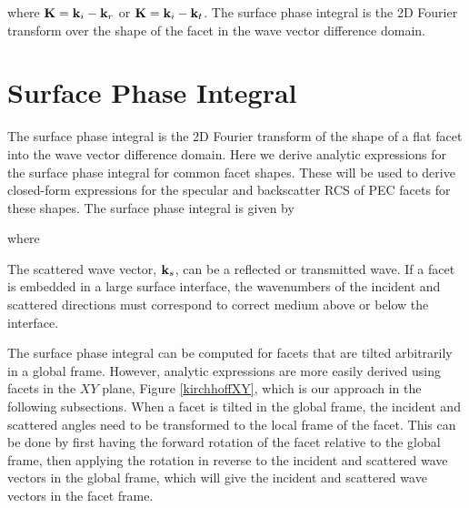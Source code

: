\noindent where $\mathbf{K} = \mathbf{k}_i - \mathbf{k}_r$ or $\mathbf{K} = \mathbf{k}_i - \mathbf{k}_t$.  The surface phase integral is the 2D Fourier transform over the shape of the facet in the wave vector difference domain. 


\section{Surface Phase Integral}
\label{secsurfphaseint}
The surface phase integral is the 2D Fourier transform of the shape of a flat facet into the wave vector difference domain. Here we derive analytic expressions for the surface phase integral for common facet shapes. These will be used to derive closed-form expressions for the specular and backscatter RCS of PEC facets for these shapes.  The surface phase integral is given by 

\noindent where 

The scattered wave vector, $\mathbf{k}_s$, can be a reflected or transmitted wave. If a facet is embedded in a large surface interface, the wavenumbers of the incident and scattered directions must correspond to correct medium above or below the interface. 

The surface phase integral can be computed for facets that are tilted arbitrarily in a global frame. However, analytic expressions are more easily derived using facets in the $XY$ plane, Figure \ref{kirchhoffXY}, which is our approach in the following subsections. When a facet is tilted in the global frame, the incident and scattered angles need to be transformed to the local frame of the facet. This can be done by first having the forward rotation of the facet relative to the global frame, then applying the rotation in reverse to the incident and scattered wave vectors in the global frame, which will give the incident and scattered wave vectors in the facet frame.

